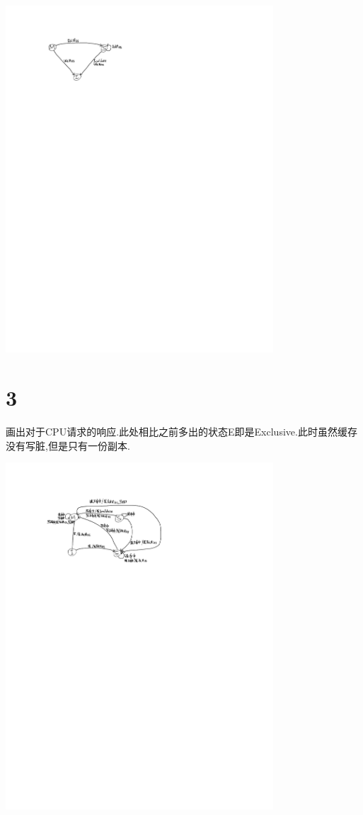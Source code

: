 \documentclass[adobefonts, nocap]{ctexart}
\begin{document}
    \begin{center}
      \includegraphics[width=10cm]{2-crop.pdf}
    \end{center}
  \section*{3}
    画出对于CPU请求的响应.此处相比之前多出的状态E即是Exclusive.此时虽然缓存没有写脏,但是只有一份副本.

    \begin{center}
      \includegraphics[width=10cm]{3-crop.pdf}
    \end{center}
\end{document}

